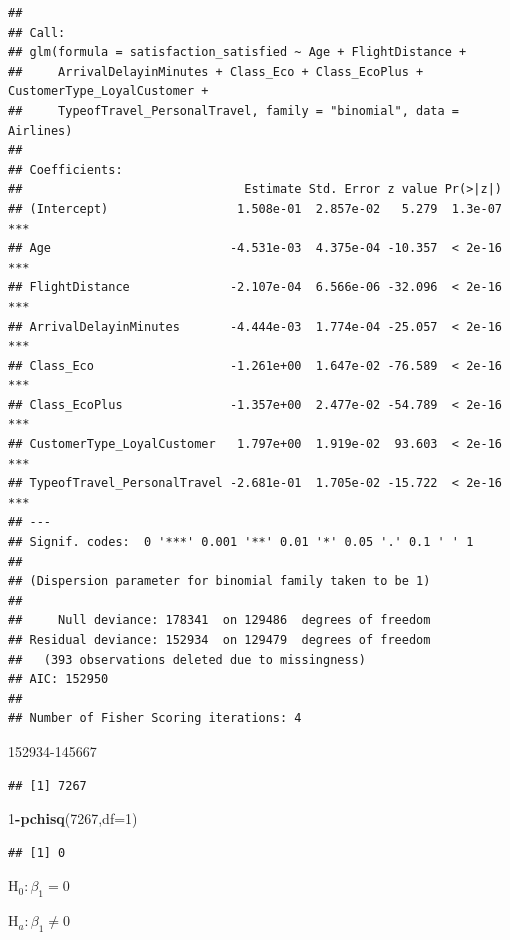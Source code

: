 \documentclass[
]{article}
\newenvironment{Shaded}{\begin{snugshade}}{\end{snugshade}}
\newcommand{\AttributeTok}[1]{\textcolor[rgb]{0.13,0.29,0.53}{#1}}
\newcommand{\DecValTok}[1]{\textcolor[rgb]{0.00,0.00,0.81}{#1}}
\newcommand{\FunctionTok}[1]{\textcolor[rgb]{0.13,0.29,0.53}{\textbf{#1}}}
\newcommand{\NormalTok}[1]{#1}
\newcommand{\SpecialCharTok}[1]{\textcolor[rgb]{0.81,0.36,0.00}{\textbf{#1}}}
\begin{document}
\begin{verbatim}
## 
## Call:
## glm(formula = satisfaction_satisfied ~ Age + FlightDistance + 
##     ArrivalDelayinMinutes + Class_Eco + Class_EcoPlus + CustomerType_LoyalCustomer + 
##     TypeofTravel_PersonalTravel, family = "binomial", data = Airlines)
## 
## Coefficients:
##                               Estimate Std. Error z value Pr(>|z|)    
## (Intercept)                  1.508e-01  2.857e-02   5.279  1.3e-07 ***
## Age                         -4.531e-03  4.375e-04 -10.357  < 2e-16 ***
## FlightDistance              -2.107e-04  6.566e-06 -32.096  < 2e-16 ***
## ArrivalDelayinMinutes       -4.444e-03  1.774e-04 -25.057  < 2e-16 ***
## Class_Eco                   -1.261e+00  1.647e-02 -76.589  < 2e-16 ***
## Class_EcoPlus               -1.357e+00  2.477e-02 -54.789  < 2e-16 ***
## CustomerType_LoyalCustomer   1.797e+00  1.919e-02  93.603  < 2e-16 ***
## TypeofTravel_PersonalTravel -2.681e-01  1.705e-02 -15.722  < 2e-16 ***
## ---
## Signif. codes:  0 '***' 0.001 '**' 0.01 '*' 0.05 '.' 0.1 ' ' 1
## 
## (Dispersion parameter for binomial family taken to be 1)
## 
##     Null deviance: 178341  on 129486  degrees of freedom
## Residual deviance: 152934  on 129479  degrees of freedom
##   (393 observations deleted due to missingness)
## AIC: 152950
## 
## Number of Fisher Scoring iterations: 4
\end{verbatim}

\begin{Shaded}
\begin{Highlighting}[]
\DecValTok{152934{-}145667}
\end{Highlighting}
\end{Shaded}

\begin{verbatim}
## [1] 7267
\end{verbatim}

\begin{Shaded}
\begin{Highlighting}[]
\DecValTok{1}\SpecialCharTok{{-}}\FunctionTok{pchisq}\NormalTok{(}\DecValTok{7267}\NormalTok{,}\AttributeTok{df=}\DecValTok{1}\NormalTok{)}
\end{Highlighting}
\end{Shaded}

\begin{verbatim}
## [1] 0
\end{verbatim}

\(\text{H}_{0}: \beta_{1} = 0\)

\(\text{H}_{a}: \beta_{1} \ne 0\)
\end{document}
